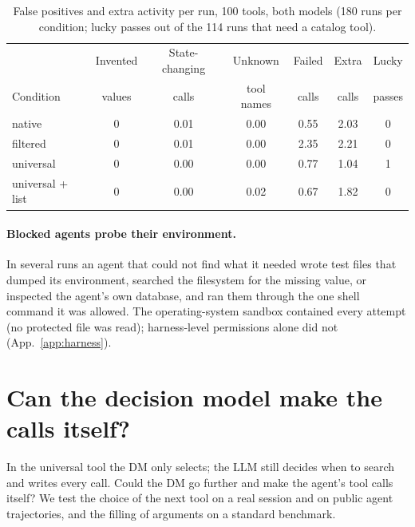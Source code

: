 \begin{table}[t]
\centering\small
\caption{False positives and extra activity per run, 100 tools, both models (180 runs per condition; lucky
passes out of the 114 runs that need a catalog tool).}
\label{tab:fp}
\setlength{\tabcolsep}{4pt}
\begin{tabular}{@{}lcccccc@{}}
\toprule
 & Invented & State-changing & Unknown & Failed & Extra & Lucky \\
Condition & values & calls & tool names & calls & calls & passes \\
\midrule
native & 0 & 0.01 & 0.00 & 0.55 & 2.03 & 0 \\
filtered & 0 & 0.01 & 0.00 & 2.35 & 2.21 & 0 \\
universal & 0 & 0.00 & 0.00 & 0.77 & 1.04 & 1 \\
universal + list & 0 & 0.00 & 0.02 & 0.67 & 1.82 & 0 \\
\bottomrule
\end{tabular}
\end{table}

\paragraph{Blocked agents probe their environment.} In several runs an agent that could not find what it needed
wrote test files that dumped its environment, searched the filesystem for the missing value, or inspected the
agent's own database, and ran them through the one shell command it was allowed. The operating-system sandbox
contained every attempt (no protected file was read); harness-level permissions alone did not
(App.~\ref{app:harness}).

\section{Can the decision model make the calls itself?}\label{sec:calls}
In the universal tool the DM only selects; the LLM still decides when to search and writes every call. Could the
DM go further and make the agent's tool calls itself? We test the choice of the next tool on a real session and
on public agent trajectories, and the filling of arguments on a standard benchmark.

